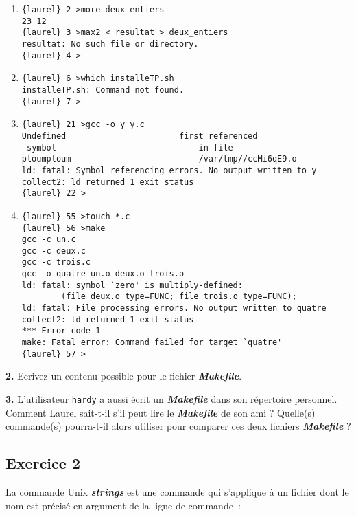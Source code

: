 \documentclass[10pt]{article}
\newcommand{\unix}[1]{\hspace*{2cm}{\tt #1}}
\newcommand{\fich}[1]{{\bf \em #1}}
\begin{document}
\begin{enumerate}
\item
\begin{verbatim}
{laurel} 2 >more deux_entiers 
23 12
{laurel} 3 >max2 < resultat > deux_entiers
resultat: No such file or directory.
{laurel} 4 >
\end{verbatim}
\vspace*{1em}
\item
\begin{verbatim}
{laurel} 6 >which installeTP.sh 
installeTP.sh: Command not found.
{laurel} 7 >
\end{verbatim}
\vspace*{1em}
\item
\begin{verbatim}
{laurel} 21 >gcc -o y y.c
Undefined                       first referenced
 symbol                             in file
ploumploum                          /var/tmp//ccMi6qE9.o
ld: fatal: Symbol referencing errors. No output written to y
collect2: ld returned 1 exit status
{laurel} 22 >
\end{verbatim}
\vspace*{1em}
\item
\begin{verbatim}
{laurel} 55 >touch *.c
{laurel} 56 >make
gcc -c un.c
gcc -c deux.c
gcc -c trois.c
gcc -o quatre un.o deux.o trois.o
ld: fatal: symbol `zero' is multiply-defined:
        (file deux.o type=FUNC; file trois.o type=FUNC);
ld: fatal: File processing errors. No output written to quatre
collect2: ld returned 1 exit status
*** Error code 1
make: Fatal error: Command failed for target `quatre'
{laurel} 57 >
\end{verbatim}
\end{enumerate}

{\bf 2.} Ecrivez un contenu possible pour le fichier \fich{Makefile}.

{\bf 3.} L'utilisateur {\tt hardy} a aussi écrit un \fich{Makefile} dans son 
	répertoire personnel. Comment Laurel sait-t-il s'il peut lire le \fich{Makefile}
	de son ami ? Quelle(s) commande(s) pourra-t-il alors utiliser 
	pour comparer ces deux fichiers \fich{Makefile} ?

\subsection*{Exercice 2}

La commande {\sc Unix} \fich{strings} est une commande qui s'applique à un 
fichier dont le nom est précisé en argument de la ligne de commande~: \\
	\unix{strings fichier}
 
\end{document}
